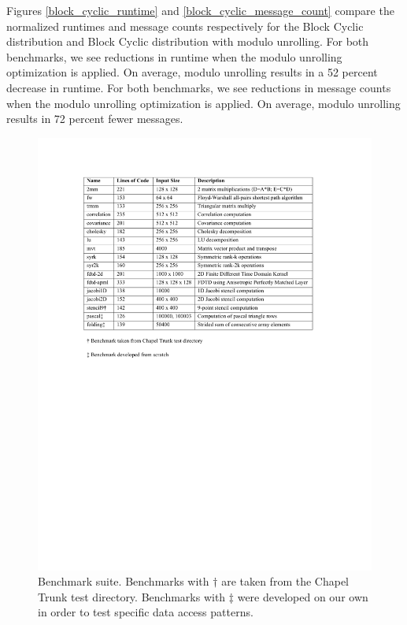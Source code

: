 Figures \ref{block_cyclic_runtime} and \ref{block_cyclic_message_count} compare the normalized runtimes and message counts respectively for the Block Cyclic distribution and Block Cyclic distribution with modulo unrolling. For both benchmarks, we see reductions in runtime when the modulo unrolling optimization is applied. On average, modulo unrolling results in a 52 percent decrease in runtime. For both benchmarks, we see reductions in message counts when the modulo unrolling optimization is applied. On average, modulo unrolling results in 72 percent fewer messages. 


\begin{figure}
	\begin{center}
	\includegraphics[scale=0.60]{./Figures/Benchmarks.pdf}
	\caption{Benchmark suite. Benchmarks with $\dagger$ are taken from the Chapel Trunk test directory. Benchmarks with $\ddagger$ were developed on our own in order to test specific data access patterns. }
	\label{benchmarks}
	\end{center}
\end{figure}

